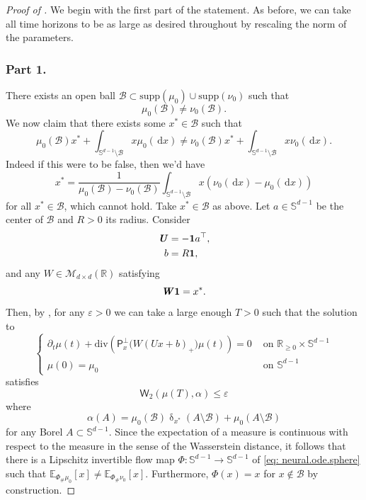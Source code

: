 \documentclass[a4paper,11pt]{article}
\theoremstyle{plain}
\newcommand{\supp}{\mathrm{supp}}
\newcommand{\R}{\mathbb{R}}
\newcommand{\proj}{\bm{\mathsf{P}}^\perp}
\newcommand{\diff}{\, \mathrm{d}}
\newcommand{\dive}{\mathrm{div}}
\renewcommand{\S}{\mathbb{S}^{d-1}}
\newcommand{\bW}{\bm{\mathit{W}}}
\newcommand{\bU}{\bm{\mathit{U}}}
\renewcommand{\leq}{\leqslant}
\renewcommand{\geq}{\geqslant}
\numberwithin{equation}{section}
\begin{document}
\begin{proof}[Proof of ]
We begin with the first part of the statement. As before, we can take all time horizons to be as large as desired throughout by rescaling the norm of the parameters.

\subsubsection*{Part 1.}
There exists an open ball $\mathscr{B}\subset \supp(\mu_0)\cup\supp(\nu_0)$ such that
\begin{equation*}
\mu_0(\mathscr{B})\neq\nu_0(\mathscr{B}).
\end{equation*}
We now claim that there exists some $x^*\in\mathscr{B}$ such that 
\begin{equation*}
\mu_0(\mathscr{B})x^*+\int_{\S\setminus \mathscr{B}}x \mu_0(\diff x)\neq \nu_0(\mathscr{B})x^*+\int_{\S\setminus\mathscr{B}}x \nu_0(\diff x).
\end{equation*}
Indeed if this were to be false, then we'd have 
\begin{equation*}
x^*=\frac{1}{\mu_0(\mathscr{B})-\nu_0(\mathscr{B})}\int_{\S\setminus\mathscr{B}} x(\nu_0(\diff x)-\mu_0(\diff x))
\end{equation*}
for all $x^*\in\mathscr{B}$, which cannot hold. Take $x^*\in \mathscr{B}$ as above. 
Let $a\in\S$ be the center of $\mathscr{B}$ and $R>0$ its radius. 
Consider
\begin{align} \label{eq: controls.1}
\bU &= -{\bf1}a^\top,\\ 
b&= R {\bf1}, \nonumber
\end{align}
and any $\bW\in\mathscr{M}_{d\times d}(\R)$ satisfying
\begin{equation} \label{eq: controls.2}
\bW {\bf1}=x^*.
\end{equation}
Then, by , for any $\varepsilon>0$ we can take a large enough $T>0$ such that the solution to
\begin{equation*}
\begin{cases}
\partial_t \mu(t)+\dive\left(\proj_x\Big(\bW(\bU x+b)_+\Big)\mu(t)\right)=0 &\text{ on } \R_{\geq0}\times\S\\
\mu(0)=\mu_0 &\text{ on } \S
\end{cases}
\end{equation*}
satisfies
\begin{equation*}
\mathsf{W}_2(\mu(T),\alpha)\leq\varepsilon
\end{equation*}
where
\begin{equation*}
\alpha(A)=\mu_0(\mathscr{B})\updelta_{x^*}(A\setminus\mathscr{B})+\mu_0(A\setminus\mathscr{B})
\end{equation*}
for any Borel $A\subset\S$.
Since the expectation of a measure is continuous with respect to the measure in the sense of the Wasserstein distance, it follows that there is a Lipschitz invertible flow map $\Phi:\S\to\S$ of \eqref{eq: neural.ode.sphere} such that $\mathbb{E}_{\Phi_\#\mu_0}[x]\neq\mathbb{E}_{\Phi_\#\nu_0}[x]$. Furthermore, $\Phi(x)=x$ for $x\notin\mathscr{B}$ by construction.


\end{proof}
\end{document}
